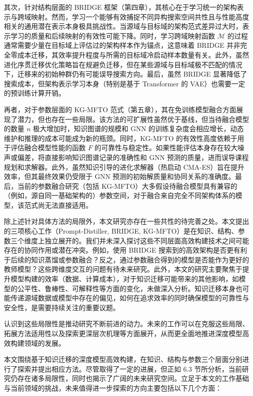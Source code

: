 \documentclass[../main.tex]{subfiles}
\begin{document}
其次，针对结构层面的 BRIDGE 框架（第四章），其核心在于学习统一的架构表示与跨域映射。然而，学习一个能够有效捕捉不同异构搜索空间共性且与性能高度相关的通用潜在表示本身极具挑战性。当源域与目标域的架构范式差异过大时，表示学习的质量和后续映射的有效性可能下降。同时，学习跨域映射函数 $\mathcal{M}$ 的过程通常需要少量在目标域上评估过的架构样本作为锚点，这意味着 BRIDGE 并非完全零成本迁移，其效率提升程度与所需的目标域冷启动样本数量有关。此外，虽然进化序贯迁移优化策略旨在规避负迁移，但在某些源域与目标域极不匹配的情况下，迁移来的初始种群仍有可能误导搜索方向。最后，虽然 BRIDGE 显著降低了搜索成本，但架构表示学习本身（特别是基于 Transformer 的 VAE）也需要一定的预训练计算开销。

再者，对于参数层面的 KG-MFTO 范式（第五章），其在免训练模型融合方面展现了潜力，但也存在一些局限。该方法的可扩展性虽然优于基线，但当待融合模型的数量 $n$ 极大增加时，知识图谱的规模和 GNN 的训练复杂度会相应增长，动态维护和推理的成本可能成为新的瓶颈。同时，KG-MFTO 的有效性高度依赖于用于评估融合模型性能的函数 $F$ 的可靠性与稳定性。如果性能评估本身存在较大噪声或偏差，将直接影响知识图谱记录的准确性和 GNN 预测的质量，进而误导课程规划和求解器。此外，虽然知识引导的进化求解器（热启动 CMA-ES）旨在提升效率，但其最终效果仍受限于 GNN 预测的初始解质量和协同关系的准确度。最后，当前的参数融合研究（包括 KG-MFTO）大多假设待融合模型具有兼容的（例如，源自同一基础架构的）参数空间，对于融合来自完全不同架构体系的模型，该范式尚无法直接适用。

除上述针对具体方法的局限外，本文研究亦存在一些共性的待完善之处。本文提出的三项核心工作（Prompt-Distiller, BRIDGE, KG-MFTO）是在知识、结构、参数三个维度上独立展开的。我们并未深入探讨这些不同层面高效构建技术之间可能存在的协同作用或潜在冲突。例如，使用 BRIDGE 搜索到的高效架构是否更有利于后续的知识蒸馏或参数融合？反之，通过参数融合得到的模型是否能作为更好的教师模型？这些跨维度交互的问题有待未来研究。此外，本文的研究主要聚焦于提升模型构建的效率（数据、计算成本），对于知识迁移可能带来的其他影响，如模型的公平性、鲁棒性、可解释性等方面的变化，未做深入分析。知识迁移本身也可能传递源域数据或模型中存在的偏见，如何在追求效率的同时确保模型的可靠性与安全性，是需要持续关注的重要议题。

认识到这些局限性是推动研究不断前进的动力。未来的工作可以在克服这些局限、拓展方法适用性以及探索更深层次机理等方面展开，从而更全面地推进深度模型高效构建领域的发展。


本文围绕基于知识迁移的深度模型高效构建，在知识、结构与参数三个层面分别进行了探索并提出相应方法。尽管取得了一定的进展，但正如 6.3 节所分析，当前研究仍存在诸多局限性，同时也揭示了广阔的未来研究空间。立足于本文的工作基础与当前领域的挑战，未来值得进一步探索的方向主要包括以下几个方面：
\end{document}
